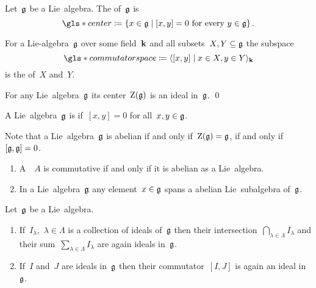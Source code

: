 \begin{definition}
  Let~$\mathfrak{g}$ be a Lie~algebra.
  The  of~$\mathfrak{g}$ is
  \[
    \gls*{center}
    \defined
    \{
      x \in \glie
    \suchthat
      \text{$[x,y] = 0$ for every~$y \in \glie$}
    \}  \,.
  \]
\end{definition}


\begin{definition}
  For a Lie-algebra~$\mathfrak{g}$ over some field~$\kf$ and all subsets~$X, Y \subseteq \mathfrak{g}$ the subspace
  \[
    \gls*{commutator space}
    \defined
    \gen{
      [x,y]
    \suchthat
      x \in X,
      y \in Y
    }_{\kf}
  \]
  is the  of~$X$ and~$Y$.
\end{definition}


\begin{lemma}
  For any Lie~algebra~$\mathfrak{g}$ its center~$\operatorname{Z}(\mathfrak{g})$ is an ideal in~$\mathfrak{g}$.
  \qed
\end{lemma}


\begin{definition}
  A Lie~algebra~$\mathfrak{g}$ is  if~$[x,y] = 0$ for all~$x, y \in \mathfrak{g}$.
\end{definition}


\begin{remark}
  Note that a Lie~algebra~$\mathfrak{g}$ is abelian if and only if~$\operatorname{Z}(\mathfrak{g}) = \mathfrak{g}$, if and only if~$[\mathfrak{g}, \mathfrak{g}] = 0$.
\end{remark}


\begin{example}
  \leavevmode
  \begin{enumerate}
    \item
      A~{\algebra{$\kf$}}~$A$ is commutative if and only if it is abelian as a Lie~algebra.
    \item
      In a Lie~algebra~$\mathfrak{g}$ any element~$x \in \mathfrak{g}$ spans a {\onedimensional} abelian Lie~subalgebra of~$\mathfrak{g}$.
  \end{enumerate}
\end{example}


\begin{lemma}
  Let~$\mathfrak{g}$ be a Lie~algebra.
  \begin{enumerate}
    \item
    If~$I_\lambda$,~$\lambda \in \Lambda$ is a collection of ideals of~$\mathfrak{g}$ then their intersection~$\bigcap_{\lambda \in \Lambda} I_\lambda$ and their sum~$\sum_{\lambda \in \Lambda} I_\lambda$ are again ideals in~$\mathfrak{g}$.
    \item
    If~$I$ and~$J$ are ideals in~$\mathfrak{g}$ then their commutator~$[I,J]$ is again an ideal in~$\mathfrak{g}$.
  \end{enumerate}
\end{lemma}


